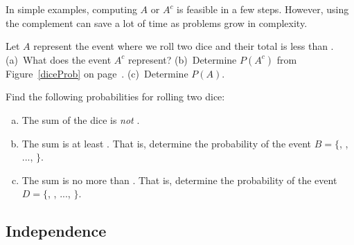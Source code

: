 In simple examples, computing $A$ or $A^c$ is feasible in a few steps. However, using the complement can save a lot of time as problems grow in complexity.

\begin{exercisewrap}
\begin{nexercise}
Let $A$ represent the event where we roll two dice and their total is less than . (a)~What does the event $A^c$ represent? (b)~Determine $P(A^c)$ from Figure~\ref{diceProb} on page~\pageref{diceProb}. (c)~Determine $P(A)$.\footnotemark
\end{nexercise}
\end{exercisewrap}

\begin{exercisewrap}
\begin{nexercise}
Find the following probabilities for rolling two dice:\footnotemark
\begin{enumerate}[(a)]
\setlength{\itemsep}{0mm}
\item The sum of the dice is \emph{not} . 
\item The sum is at least .
    That is, determine the probability of the event
    $B = \{$, , ..., $\}$.
\item The sum is no more than .
    That is, determine the probability of the event
    $D=\{$, , ..., $\}$.
\end{enumerate}
\end{nexercise}
\end{exercisewrap}


\subsection{Independence}
\label{probabilityIndependence}

